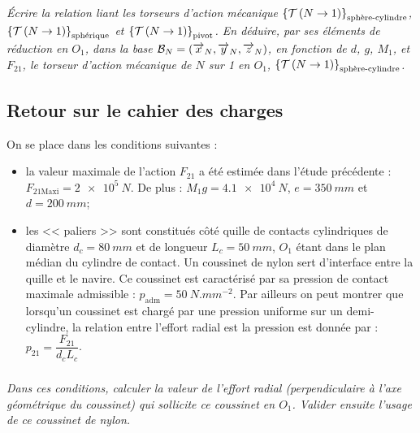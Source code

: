 \documentclass[10pt,fleqn]{article} %
\begin{document}
\begin{multicols}{2}
\subparagraph{}\textit{Écrire la relation liant les torseurs d’action mécanique $\left\{\mathcal{T} \left(N\rightarrow 1 \right) \right\}_{\text{sphère-cylindre}}$, $\left\{\mathcal{T} \left(N\rightarrow 1 \right) \right\}_{\text{sphérique}}$ et $\left\{\mathcal{T} \left(N\rightarrow 1 \right) \right\}_{\text{pivot}}$.
En déduire, par ses éléments de réduction en $O_1$, dans la
base $\mathcal{B}_N=\left(\overrightarrow{x}_N , \overrightarrow{y}_N , \overrightarrow{z}_N \right)$, en fonction de $d$, $g$, $M_1$, et $F_{21}$, le torseur d’action mécanique de $N$ sur 1 en $O_1$, $\left\{\mathcal{T} \left(N\rightarrow 1 \right) \right\}_{\text{sphère-cylindre}}$.}
\ifprof
\begin{corrige}
\end{corrige}
\else
\fi


\subsection*{Retour sur le cahier des charges}
On se place dans les conditions suivantes :
\begin{itemize}
\item la valeur maximale de l’action $F_{21}$ a été estimée dans l’étude précédente : $F_{21\text{Maxi}}=\SI{2e5}{N}$. De
plus : $M_1 g = \SI{4,1e4}{N}$, $e=\SI{350}{mm}$ et $d=\SI{200}{mm}$;
\item les << paliers >> sont constitués côté quille de contacts cylindriques de diamètre $d_c =\SI{80}{mm}$ et de longueur $L_c =\SI{50}{mm}$, $O_1$ étant dans le plan médian du cylindre de contact. Un coussinet de nylon
sert d’interface entre la quille et le navire. Ce coussinet est caractérisé par sa pression de contact
maximale admissible : $p_{\text{adm}}= \SI{50}{N.mm^{-2}}$. Par ailleurs on peut montrer que lorsqu'un coussinet est chargé par une pression uniforme sur un demi-cylindre, la relation entre l'effort radial est la pression est donnée par : $p_{21}=\dfrac{F_{21}}{d_cL_c}$.
\end{itemize}

\subparagraph{}\textit{Dans ces conditions, calculer la valeur de l’effort radial (perpendiculaire à l’axe géométrique du coussinet) qui sollicite ce coussinet en $O_1$.
Valider ensuite l’usage de ce coussinet de nylon.}


\end{multicols}

\end{document}

